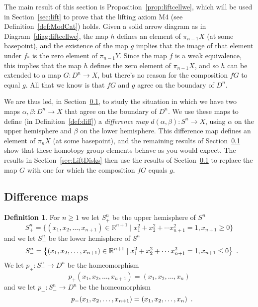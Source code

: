 \documentclass{amsart}
\numberwithin{equation}{section}
\theoremstyle{slplain}
\theoremstyle{definition}
\newtheorem{defn}[equation]{Definition} %
\theoremstyle{remark}
\newcommand{\propref}{Proposition~\ref}
\newcommand{\defref}{Definition~\ref}
\newcommand{\diagref}{Diagram~\ref}
\newcommand{\secref}{Section~\ref}
\newcommand{\R}{\mathbb{R}}
\newcommand{\suchthat}{\mid}
\newcommand{\Period}{\rlap{\enspace .}}
\begin{document}
The main result of this section is \propref{prop:liftcellwe}, which
will be used in \secref{sec:lift} to prove that the lifting axiom M4
(see \defref{def:ModCat}) holds.  Given a solid arrow diagram as in
\diagref{diag:liftcellwe}, the map $h$ defines an element of
$\pi_{n-1}X$ (at some basepoint), and the existence of the map $g$
implies that the image of that element under $f_{*}$ is the zero
element of $\pi_{n-1}Y$.  Since the map $f$ is a weak equivalence,
this implies that the map $h$ defines the zero element of
$\pi_{n-1}X$, and so $h$ can be extended to a map $G\colon D^{n} \to
X$, but there's no reason for the composition $fG$ to equal $g$.  All
that we know is that $fG$ and $g$ agree on the boundary of $D^{n}$.

We are thus led, in \secref{sec:DiffMp}, to study the situation in
which we have two maps $\alpha,\beta\colon D^{n} \to X$ that agree on
the boundary of $D^{n}$.  We use these maps to define (in
\defref{def:diff}) a \emph{difference map} $d(\alpha,\beta)\colon
S^{n} \to X$, using $\alpha$ on the upper hemisphere and $\beta$ on
the lower hemisphere.  This difference map defines an element of
$\pi_{n}X$ (at some basepoint), and the remaining results of
\secref{sec:DiffMp} show that these homotopy group elements behave as
you would expect.  The results in \secref{sec:LiftDisks} then use the
results of \secref{sec:DiffMp} to replace the map $G$ with one for
which the composition $fG$ equals $g$.

\subsection{Difference maps}
\label{sec:DiffMp}

\begin{defn}
  \label{def:hemisphere}
  For $n \ge 1$ we let $S^{n}_{+}$ be the upper hemisphere of $S^{n}$
  \begin{displaymath}
    S^{n}_{+} = \bigl\{(x_{1}, x_{2}, \ldots, x_{n+1}) \in \R^{n+1}
    \suchthat x_{1}^{2} + x_{2}^{2} + \cdots x_{n+1}^{2} = 1,
    x_{n+1} \ge 0 \bigr\}
  \end{displaymath}
  and we let $S^{n}_{-}$ be the lower hemisphere of $S^{n}$
  \begin{displaymath}
    S^{n}_{-} = \bigl\{(x_{1}, x_{2}, \ldots, x_{n+1}) \in \R^{n+1}
    \suchthat x_{1}^{2} + x_{2}^{2} + \cdots x_{n+1}^{2} = 1,
    x_{n+1} \le 0 \bigr\} \Period
  \end{displaymath}
  We let $p_{+}\colon S^{n}_{+} \to D^{n}$ be the homeomorphism
  \begin{displaymath}
    p_{+}(x_{1}, x_{2}, \ldots, x_{n+1}) =
    (x_{1}, x_{2}, \ldots, x_{n})
  \end{displaymath}
  and we let $p_{-}\colon S^{n}_{-} \to D^{n}$ be the homeomorphism
  \begin{displaymath}
    p_{-}(x_{1}, x_{2}, \ldots, x_{n+1}) =
    (x_{1}, x_{2}, \ldots, x_{n}) \Period
  \end{displaymath}
\end{defn}
\end{document}
